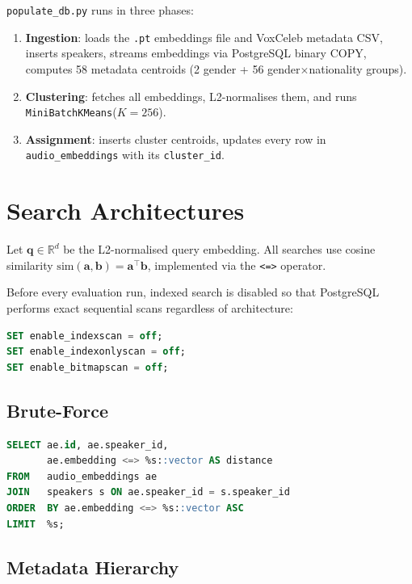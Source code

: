 \documentclass[12pt, a4paper]{article}
\newcommand{\code}[1]{\texttt{#1}}
\begin{document}
\code{populate\_db.py} runs in three phases:
\begin{enumerate}
  \item \textbf{Ingestion}: loads the \code{.pt} embeddings file and
        VoxCeleb metadata CSV, inserts speakers, streams embeddings via
        PostgreSQL binary COPY, computes 58 metadata centroids
        (2 gender + 56 gender$\times$nationality groups).
  \item \textbf{Clustering}: fetches all embeddings, L2-normalises them,
        and runs \code{MiniBatchKMeans}($K{=}256$).
  \item \textbf{Assignment}: inserts cluster centroids, updates every
        row in \code{audio\_embeddings} with its \code{cluster\_id}.
\end{enumerate}

\section{Search Architectures}
\label{sec:search}

Let $\mathbf{q}\in\mathbb{R}^{d}$ be the L2-normalised query embedding.
All searches use cosine similarity
$\mathrm{sim}(\mathbf{a},\mathbf{b})=\mathbf{a}^{\top}\mathbf{b}$,
implemented via the \code{<=>} operator.

Before every evaluation run, indexed search is disabled so that
PostgreSQL performs exact sequential scans regardless of architecture:

\begin{lstlisting}[language=SQL, numbers=none,
    caption={Index scan disabled before every evaluation run.}]
SET enable_indexscan = off;
SET enable_indexonlyscan = off;
SET enable_bitmapscan = off;
\end{lstlisting}
\newpage
\subsection{Brute-Force}
\begin{lstlisting}[language=SQL, numbers=none,
    caption={Brute-force utterance-level query.}]
SELECT ae.id, ae.speaker_id,
       ae.embedding <=> %s::vector AS distance
FROM   audio_embeddings ae
JOIN   speakers s ON ae.speaker_id = s.speaker_id
ORDER  BY ae.embedding <=> %s::vector ASC
LIMIT  %s;
\end{lstlisting}

\subsection{Metadata Hierarchy}
\end{document}
